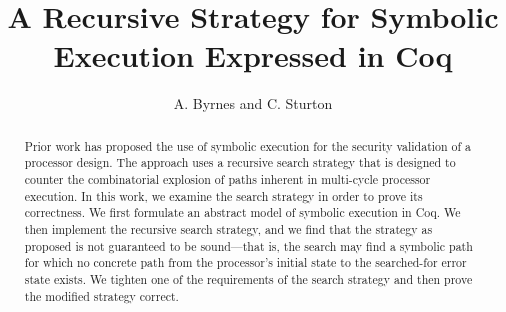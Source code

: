 \documentclass[runningheads]{llncs}
\begin{document}
\title{A Recursive Strategy for Symbolic Execution Expressed in Coq}
\author{A. Byrnes and C. Sturton}




\maketitle

\begin{abstract}
Prior work has proposed the use of symbolic execution for the security
validation of a processor design. The approach uses a recursive search strategy
that is designed to counter the combinatorial explosion of paths inherent in multi-cycle
processor execution. In this work, we examine the search strategy in order to
prove its correctness. We first formulate an abstract model of symbolic
execution in Coq. We then implement the recursive search strategy, and we find that the
strategy as proposed is not guaranteed to be sound---that is, the
search may find a symbolic path for which no concrete path from the processor's initial state
to the searched-for error state exists. We tighten one of the requirements of the
search strategy and then prove the modified strategy correct. 
\end{abstract}






%




%




\end{document}
